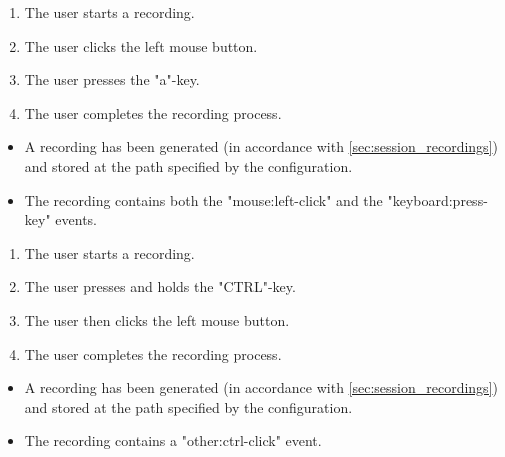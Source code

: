 \begin{tests}
    {\begin{enumerate}
        \item The \gls{user} starts a recording.
        \item The \gls{user} clicks the left mouse button.
        \item The \gls{user} presses the "a"-key.
        \item The \gls{user} completes the recording process.
    \end{enumerate}}
    {\begin{itemize}
        \item A recording has been generated (in accordance with \ref{sec:session_recordings}) and stored at the path specified by the configuration.
        \item The recording contains both the "mouse:left-click" and the "keyboard:press-key" events.
    \end{itemize}}
\newpage
    {\begin{enumerate}
        \item The \gls{user} starts a recording.
        \item The \gls{user} presses and holds the "CTRL"-key.
        \item The \gls{user} then clicks the left mouse button.
        \item The \gls{user} completes the recording process.
    \end{enumerate}}
    {\begin{itemize}
        \item A recording has been generated (in accordance with \ref{sec:session_recordings}) and stored at the path specified by the configuration.
        \item The recording contains a "other:ctrl-click" event.
    \end{itemize}}


\end{tests}
